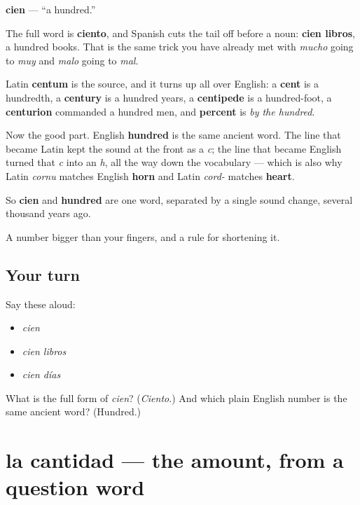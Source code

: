 \begin{cousinweb}
\textbf{cien} — \textquotedblleft{}a hundred.\textquotedblright{}

The full word is \textbf{ciento}, and Spanish cuts the tail off before a noun: \textbf{cien libros}, a hundred books. That is the same trick you have already met with \emph{mucho} going to \emph{muy} and \emph{malo} going to \emph{mal}.

Latin \textbf{centum} is the source, and it turns up all over English: a \textbf{cent} is a hundredth, a \textbf{century} is a hundred years, a \textbf{centipede} is a hundred-foot, a \textbf{centurion} commanded a hundred men, and \textbf{percent} is \emph{by the hundred}.

Now the good part. English \textbf{hundred} is the same ancient word. The line that became Latin kept the sound at the front as a \emph{c}; the line that became English turned that \emph{c} into an \emph{h}, all the way down the vocabulary — which is also why Latin \emph{cornu} matches English \textbf{horn} and Latin \emph{cord-} matches \textbf{heart}.

So \textbf{cien} and \textbf{hundred} are one word, separated by a single sound change, several thousand years ago.
\end{cousinweb}

\begin{grammarlens}[title={What you've built}]
A number bigger than your fingers, and a rule for shortening it.
\end{grammarlens}

\subsection*{Your turn}
Say these aloud:

\begin{itemize}
\raggedright
  \item \emph{cien}
  \item \emph{cien libros}
  \item \emph{cien días}
\end{itemize}

\begin{tcolorbox}[breakable,colback=teal!4,colframe=teal!35!black,title={Before you move on}]
What is the full form of \emph{cien}? (\emph{Ciento}.) And which plain English number is the same ancient word? (Hundred.)
\end{tcolorbox}
\section[la cantidad]{la cantidad — the amount, from a question word}

